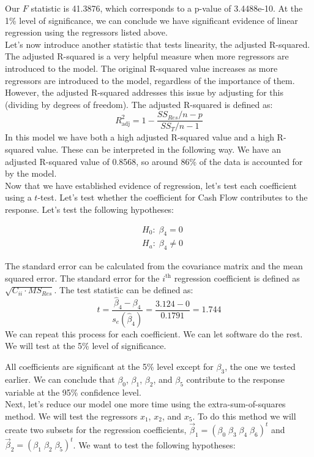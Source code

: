 \documentclass[12pt,letterpaper]{article}
\begin{document}
Our $F$ statistic is 41.3876, which corresponds to a p-value of 3.4488e-10. At the 1\% level of significance, we can conclude we have significant evidence of linear regression using the regressors listed above.\\[3mm]
Let's now introduce another statistic that tests linearity, the adjusted R-squared. The adjusted R-squared is a very helpful measure when more regressors are introduced to the model. The original R-squared value increases as more regressors are introduced to the model, regardless of the importance of them. However, the adjusted R-squared addresses this issue by adjusting for this (dividing by degrees of freedom). The adjusted R-squared is defined as: $$R_{\text{adj}}^2=1-\frac{SS_{Res}/n-p}{SS_T/n-1}$$ In this model we have both a high adjusted R-squared value and a high R-squared value. These can be interpreted in the following way. We have an adjusted R-squared value of 0.8568, so around 86\% of the data is accounted for by the model.\\[3mm]
Now that we have established evidence of regression, let's test each coefficient using a $t$-test. Let's test whether the coefficient for Cash Flow contributes to the response. Let's test the following hypotheses:

\begin{align*}
	&H_0:\; \beta_4=0\\
	&H_a:\; \beta_4\neq 0
\end{align*}

The standard error can be calculated from the covariance matrix and the mean squared error. The standard error for the $i^{\text{th}}$ regression coefficient is defined as $\sqrt{C_{ii}\cdot MS_{Res}}$. The test statistic can be defined as: $$t=\frac{\hat{\beta}_4-\beta_4}{s_e\left(\hat{\beta}_4\right)}=\frac{3.124-0}{0.1791}=1.744$$ We can repeat this process for each coefficient. We can let software do the rest. We will test at the 5\% level of significance.

\begin{mdframed}

\end{mdframed}

All coefficients are significant at the 5\% level except for $\beta_3$, the one we tested earlier. We can conclude that $\beta_0$, $\beta_1$, $\beta_2$, and $\beta_5$ contribute to the response variable at the 95\% confidence level.\\[3mm]
Next, let's reduce our model one more time using the extra-sum-of-squares method. We will test the regressors $x_1$, $x_2$, and $x_5$. To do this method we will create two subsets for the regression coefficients, $\vec{\beta}_1=\left(\beta_0\;\beta_3\;\beta_4\;\beta_6\right)^t$ and $\vec{\beta}_2=\left(\beta_1\;\beta_2\;\beta_5\right)^t$. We want to test the following hypotheses:
\end{document}
